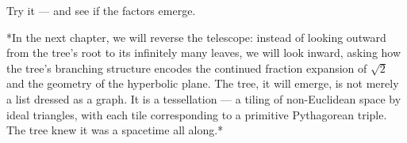 Try it --- and see if the factors emerge.


\bigskip


*In the next chapter, we will reverse the telescope: instead of looking outward from the tree's root to its infinitely many leaves, we will look inward, asking how the tree's branching structure encodes the continued fraction expansion of $\sqrt{2}$ and the geometry of the hyperbolic plane. The tree, it will emerge, is not merely a list dressed as a graph. It is a tessellation --- a tiling of non-Euclidean space by ideal triangles, with each tile corresponding to a primitive Pythagorean triple. The tree knew it was a spacetime all along.*


